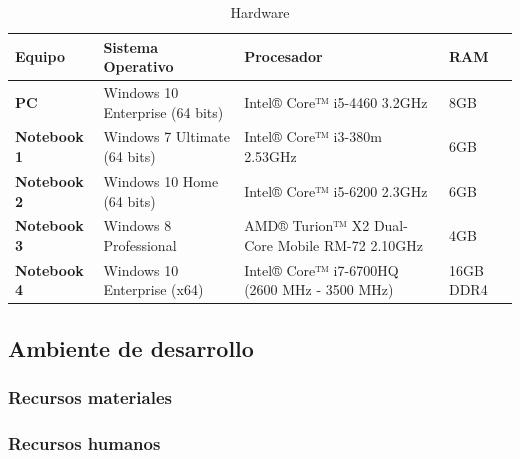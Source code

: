     \begin{table}[!ht]
    	\centering
        \caption{Hardware} \label{table:listaequipos}
        \begin{tabularx}{\textwidth}{|p{2cm}@{}|X|X|p{2cm}@{}|}
           \hline
           {\bf Equipo} & {\bf Sistema Operativo} & {\bf Procesador} & {\bf RAM}\\
           \hline
           {\bf PC} & {Windows 10 Enterprise (64 bits)} & {Intel® Core™ i5-4460 3.2GHz} & {8GB} \\
           \hline%
           {\bf Notebook 1} & {Windows 7 Ultimate (64 bits)} & {Intel® Core™ i3-380m 2.53GHz} & {6GB} \\
           \hline%
           {\bf Notebook 2} & {Windows 10 Home (64 bits)} & {Intel® Core™ i5-6200 2.3GHz} & {6GB} \\
           \hline%
           {\bf Notebook 3} & {Windows 8 Professional } & {AMD® Turion™ X2 Dual-Core Mobile RM-72 2.10GHz} & {4GB} \\
           \hline
           {\bf Notebook 4} & {Windows 10 Enterprise (x64)} & {Intel® Core™ i7-6700HQ (2600 MHz - 3500 MHz)} & {16GB DDR4} \\
           \hline
        \end{tabularx}
    \end{table}
    
    \subsection{Ambiente de desarrollo}
	
    \subsubsection{Recursos materiales} %
    
	\subsubsection{Recursos humanos} %
    
